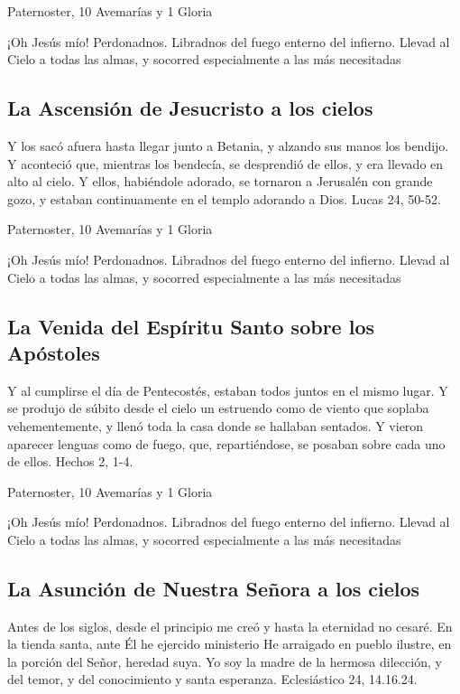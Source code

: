 \documentclass[a4paper,11pt, oneside]{report}
\begin{document}
       Paternoster, 10 Avemarías y 1 Gloria
      
      \medskip
      ¡Oh Jesús mío! Perdonadnos. Libradnos del fuego enterno del infierno. Llevad al Cielo a todas las almas, y socorred especialmente a las más 
      necesitadas
    
    \subsection*{La Ascensión de Jesucristo a los cielos}
      Y los sacó afuera hasta llegar junto a Betania, y alzando sus manos los bendijo. Y aconteció que, mientras los bendecía, se desprendió de ellos,
      y era llevado en alto al cielo. Y ellos, habiéndole adorado, se tornaron a Jerusalén con grande gozo, y estaban continuamente en el templo
      adorando a Dios. Lucas 24, 50-52.

       Paternoster, 10 Avemarías y 1 Gloria
      
      \medskip
      ¡Oh Jesús mío! Perdonadnos. Libradnos del fuego enterno del infierno. Llevad al Cielo a todas las almas, y socorred especialmente a las más 
      necesitadas
      
    \subsection*{La Venida del Espíritu Santo sobre los Apóstoles}
      Y al cumplirse el día de Pentecostés, estaban todos juntos en el mismo lugar. Y se produjo de súbito desde el cielo un estruendo como de viento
      que soplaba vehementemente, y llenó toda la casa donde se hallaban sentados. Y vieron aparecer lenguas como de fuego, que, repartiéndose, se 
      posaban sobre cada uno de ellos. Hechos 2, 1-4.

       Paternoster, 10 Avemarías y 1 Gloria
      
      \medskip
      ¡Oh Jesús mío! Perdonadnos. Libradnos del fuego enterno del infierno. Llevad al Cielo a todas las almas, y socorred especialmente a las más 
      necesitadas

    \subsection*{La Asunción de Nuestra Señora a los cielos}
      Antes de los siglos, desde el principio me creó y hasta la eternidad no cesaré. En la tienda santa, ante Él he ejercido ministerio
      He arraigado en pueblo ilustre, en la porción del Señor, heredad suya. Yo soy la madre de la hermosa dilección, y del temor, y del
      conocimiento y santa esperanza. Eclesiástico 24, 14.16.24.
\end{document}

